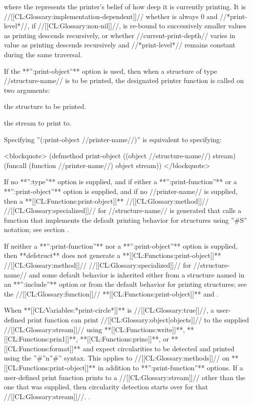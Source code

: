 where the  represents the printer's belief of how deep it is currently printing. It is //[[CL:Glossary:implementation-dependent]]// whether  is always 0 and //*print-level*//, if //[[CL:Glossary:non-nil]]//, is re-bound to successively smaller values as printing descends recursively, or whether //current-print-depth// varies in value as printing descends recursively and //*print-level*// remains constant during the same traversal.

If the **'':print-object''** option is used, then when a structure of type //structure-name// is to be printed, the designated printer function is called on two arguments:

\beginlist

\itemitem{--} the structure to be printed.

\itemitem{--} the stream to print to.

\endlist

Specifying ''(:print-object //printer-name//)'' is equivalent to specifying:

<blockquote> (defmethod print-object ((object //structure-name//) stream) (funcall (function //printer-name//) object stream)) </blockquote>

If no **'':type''** option is supplied, and if either a **'':print-function''** or a **'':print-object''** option is supplied, and if no //printer-name// is supplied, then a **[[CL:Functions:print-object]]** //[[CL:Glossary:method]]// //[[CL:Glossary:specialized]]// for //structure-name// is generated that calls a function that implements the default printing behavior for structures using ''#S'' notation; see section {\secref\PrintingStructures}.

If neither a **'':print-function''** nor a **'':print-object''** option is supplied, then **defstruct** does not generate a **[[CL:Functions:print-object]]** //[[CL:Glossary:method]]// //[[CL:Glossary:specialized]]// for //structure-name// and some default behavior is inherited either from a structure named in an **'':include''** option or from the default behavior for printing structures; see the //[[CL:Glossary:function]]// **[[CL:Functions:print-object]]** and \secref\PrintingStructures.

When **[[CL:Variables:*print-circle*]]** is //[[CL:Glossary:true]]//, a user-defined print function can print //[[CL:Glossary:object|objects]]// to the supplied //[[CL:Glossary:stream]]// using **[[CL:Functions:write]]**, **[[CL:Functions:prin1]]**, **[[CL:Functions:princ]]**, or **[[CL:Functions:format]]** and expect circularities to be detected and printed using the ''#''n''#'' syntax. This applies to //[[CL:Glossary:methods]]// on **[[CL:Functions:print-object]]** in addition to **'':print-function''** options. If a user-defined print function prints to a //[[CL:Glossary:stream]]// other than the one that was supplied, then circularity detection starts over for that //[[CL:Glossary:stream]]//. .



